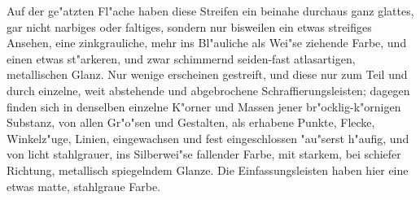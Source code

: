 \documentclass[a4paper, 11pt, oneside, german]{article}
\begin{document}
Auf der ge"atzten Fl"ache haben diese Streifen ein beinahe durchaus ganz glattes, gar nicht narbiges oder faltiges, sondern nur bisweilen ein etwas streifiges Ansehen, eine zinkgrauliche, mehr ins Bl"auliche als Wei"se ziehende Farbe, und einen etwas st"arkeren, und zwar schimmernd seiden-fast atlasartigen, metallischen Glanz. Nur wenige erscheinen gestreift, und diese nur zum Teil und durch einzelne, weit abstehende und abgebrochene Schraffierungsleisten; dagegen finden sich in denselben einzelne K"orner und Massen jener br"ocklig-k"ornigen Substanz, von allen Gr"o"sen und Gestalten, als erhabene Punkte, Flecke, Winkelz"uge, Linien, eingewachsen und fest eingeschlossen "au"serst h"aufig, und von licht stahlgrauer, ins Silberwei"se fallender Farbe, mit starkem, bei schiefer Richtung, metallisch spiegelndem Glanze. Die Einfassungsleisten haben hier eine etwas matte, stahlgraue Farbe.
\end{document}
